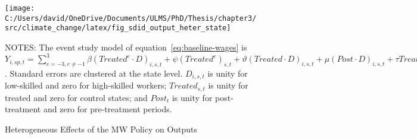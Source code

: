\begin{figure}[H]
    \centering
    \texttt{[image: C:/Users/david/OneDrive/Documents/ULMS/PhD/Thesis/chapter3/src/climate\_change/latex/fig\_sdid\_output\_heter\_state]}
    \caption{Heterogeneous Effects of the MW Policy on Outputs}
    \label{fig:baseline-manufacturing-industry-output-heter}
    \begin{minipage}{\columnwidth}
        \vspace{0.05in}
        \tiny NOTES: The event study model of equation~\ref{eq:baseline-wages} is $Y_{i,sp,t} = \sum_{{e = -3},{e \neq -1}}^{3} \beta (Treated^{e} \cdot D)_{i,s,t} + \psi (Treated^{e})_{s,t} + \vartheta (Treated \cdot D)_{i,s,t} + \mu (Post \cdot D)_{i,s,t} + \tau Treated_{s,t} + \rho D_{i,s,t} + \alpha Post_{t} + \delta X_{v,s,t-1} + \omega F_{f,t} + \lambda_{t} + \sigma_{s} + \phi_{sp} + \zeta_{sp,t} + \epsilon_{i,sp,t}$. Standard errors are clustered at the state level. $D_{i,s,t}$ is unity for low-skilled and zero for high-skilled workers; $Treated_{s,t}$ is unity for treated and zero for control states; and $Post_{t}$ is unity for post-treatment and zero for pre-treatment periods.
    \end{minipage}
\end{figure}